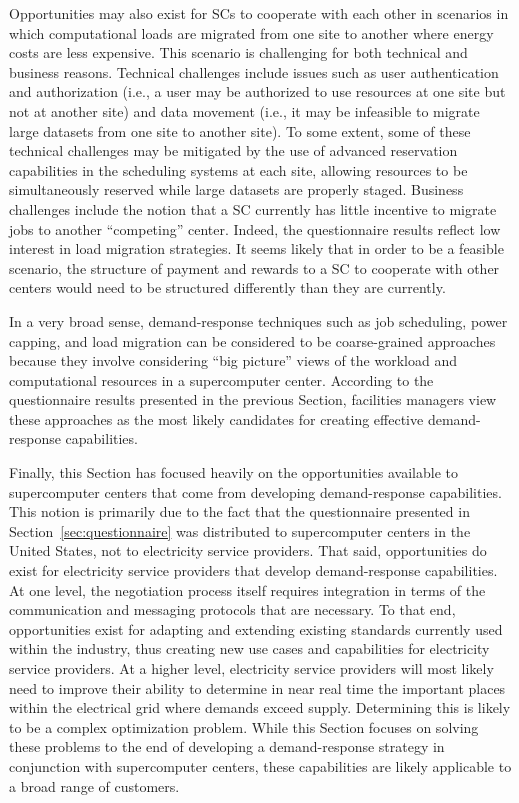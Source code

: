 Opportunities may also exist for SCs to cooperate
with each other in scenarios in which computational loads are migrated
from one site to another where energy costs are less expensive. This
scenario is challenging for both technical and business reasons.
Technical challenges include issues such as user authentication and
authorization (i.e., a user may be authorized to use resources at one
site but not at another site) and data movement (i.e., it may be
infeasible to migrate large datasets from one site to another site).
To some extent, some of these technical challenges may be mitigated by
the use of advanced reservation capabilities in the scheduling systems
at each site, allowing resources to be simultaneously reserved while
large datasets are properly staged. Business challenges include the
notion that a SC currently has little incentive to
migrate jobs to another ``competing'' center. Indeed, the
questionnaire results reflect low interest in load migration
strategies. It seems likely that in order to be a feasible scenario,
the structure of payment and rewards to a SC to
cooperate with other centers would need to be structured differently
than they are currently.

In a very broad sense, demand-response techniques such as job
scheduling, power capping, and load migration can be considered to
be coarse-grained approaches because they involve considering ``big
picture'' views of the workload and computational resources in a
supercomputer center. According to the questionnaire results
presented in the previous Section, facilities managers view these
approaches as the most likely candidates for creating effective
demand-response capabilities.

Finally, this Section has focused heavily on the opportunities
available to supercomputer centers that come from developing
demand-response capabilities. This notion is primarily due to the
fact that the questionnaire presented in Section~\ref{sec:questionnaire}
was distributed to supercomputer centers in the United States, not to
electricity service providers. That said, opportunities do exist for
electricity service providers that develop demand-response
capabilities. At one level, the negotiation process itself requires
integration in terms of the communication and messaging protocols that
are necessary. To that end, opportunities exist for adapting and
extending existing standards currently used within the industry, thus
creating new use cases and capabilities for electricity service
providers. At a higher level, electricity service providers will most
likely need to improve their ability to determine in near real time
the important places within the electrical grid where demands exceed
supply. Determining this is likely to be a complex optimization
problem. While this Section focuses on solving these problems to the
end of developing a demand-response strategy in conjunction with
supercomputer centers, these capabilities are likely applicable to a
broad range of customers.
